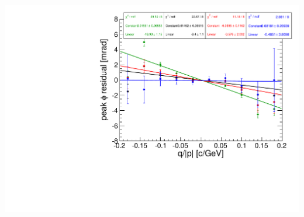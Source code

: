 \documentclass[compress]{beamer}
\begin{document}
\begin{frame}
\begin{columns}
\includegraphics[width=\linewidth]{mccuts_allmu_noinfly_ingroup_jpsi.pdf}
\end{columns}
\end{frame}
\end{document}
